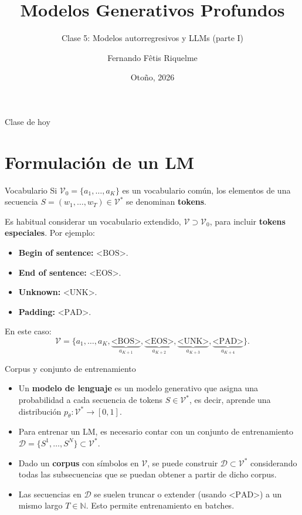 \documentclass{beamer}
\title{Modelos Generativos Profundos}
\subtitle{Clase 5: Modelos autorregresivos y LLMs (parte I)}
\author{Fernando Fêtis Riquelme}
\institute{
    Facultad de Ciencias Físicas y Matemáticas\\
    Universidad de Chile
}
\date{Otoño, 2026}
\newcommand{\N}{\mathbb{N}}
\begin{document}
\begin{frame}
    \titlepage
\end{frame}

\begin{frame}{Clase de hoy}
    \tableofcontents
\end{frame}

\section{Formulación de un LM}

\begin{frame}{Vocabulario}
    Si $\mathcal{V}_0=\{a_1,\ldots,a_K\}$ es un vocabulario común, los elementos de una secuencia $S=(w_1,\ldots,w_T)\in\mathcal{V}^*$ se denominan \textbf{tokens}.

    Es habitual considerar un vocabulario extendido, $\mathcal{V}\supset\mathcal{V}_0$, para incluir \textbf{tokens especiales}. Por ejemplo:
    \begin{itemize}
        \item \textbf{Begin of sentence:} $\text{<BOS>}$.
        \item \textbf{End of sentence:} $\text{<EOS>}$.
        \item \textbf{Unknown:} $\text{<UNK>}$.
        \item \textbf{Padding:} $\text{<PAD>}$.
    \end{itemize}
    En este caso:
    \begin{equation*}
        \mathcal{V}=\{a_1,\ldots,a_K,\underbrace{\text{<BOS>}}_{a_{K+1}},\underbrace{\text{<EOS>}}_{a_{K+2}},\underbrace{\text{<UNK>}}_{a_{K+3}},\underbrace{\text{<PAD>}}_{a_{K+4}}\}.
    \end{equation*}
\end{frame}

\begin{frame}{Corpus y conjunto de entrenamiento}
    \begin{itemize}
        \item Un \textbf{modelo de lenguaje} es un modelo generativo que asigna una probabilidad a cada secuencia de tokens $S\in\mathcal{V}^*$, es decir, aprende una distribución $p_\theta:\mathcal{V}^*\to[0,1]$.
        \item Para entrenar un LM, es necesario contar con un conjunto de entrenamiento $\mathcal{D}=\{S^1,\ldots,S^N\}\subset \mathcal{V}^*$.
        \item Dado un \textbf{corpus} con símbolos en $\mathcal{V}$, se puede construir $\mathcal{D}\subset\mathcal{V}^*$ considerando todas las subsecuencias que se puedan obtener a partir de dicho corpus.
        \item Las secuencias en $\mathcal{D}$ se suelen truncar o extender (usando $\text{<PAD>}$) a un mismo largo $T\in\N$. Esto permite entrenamiento en batches.
    \end{itemize}
\end{frame}
\end{document}
